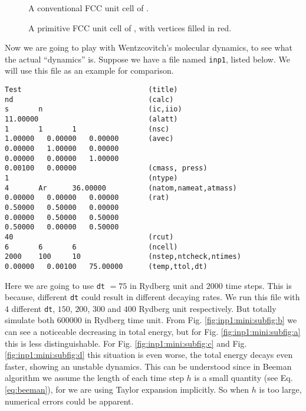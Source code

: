 \begin{figure}[H]
\begin{minipage}[t]{0.48\textwidth}
	\centering
	
	\caption{A conventional FCC unit cell of .}
	\label{fig:fcc1}
\end{minipage}
\hfill
\begin {minipage}[t]{0.48\textwidth}
\centering

\caption{A primitive FCC unit cell of , with
	vertices filled in red.}
\label{fig:fcc3}
\end{minipage}
\end{figure}

Now we are going to play with Wentzcovitch's molecular dynamics, to see what the
actual ``dynamics'' is. Suppose we have a file named \texttt{inp1}, listed below.
We will use this file as an example for comparison.
\begin{verbatim}
Test                              (title)
nd                                (calc)
s       n                         (ic,iio)
11.00000                          (alatt)
1       1       1                 (nsc)
1.00000   0.00000   0.00000       (avec)
0.00000   1.00000   0.00000
0.00000   0.00000   1.00000
0.00100   0.00000                 (cmass, press)
1                                 (ntype)
4       Ar      36.00000          (natom,nameat,atmass)
0.00000   0.00000   0.00000       (rat)
0.50000   0.50000   0.00000
0.00000   0.50000   0.50000
0.50000   0.00000   0.50000
40                                (rcut)
6       6       6                 (ncell)
2000    100     10                (nstep,ntcheck,ntimes)
0.00000   0.00100   75.00000      (temp,ttol,dt)
\end{verbatim}

\newpage
Here we are going to use \texttt{dt} $= 75$ in Rydberg unit and $2000$ time steps. This is because, different \texttt{dt} could result in different decaying rates.
We run this file with $4$ different \texttt{dt}, $150$, $200$, $300$ and $400$
Rydberg unit respectively.
But totally simulate both $600000$ in Rydberg time unit. From Fig. \ref{fig:inp1:mini:subfig:b} we can see a noticeable
decreasing in total energy, but for Fig. \ref{fig:inp1:mini:subfig:a} this is less distinguishable. For Fig. \ref{fig:inp1:mini:subfig:c} and Fig. \ref{fig:inp1:mini:subfig:d}
this situation is even worse, the total energy decays even faster, showing an unstable dynamics. This can be understood since in
Beeman algorithm we assume the length of each time step $h$ is a small quantity (see Eq. \eqref{eq:beeman}),
for we are using Taylor expansion implicitly. So when $h$ is too large, numerical errors
could be apparent.

